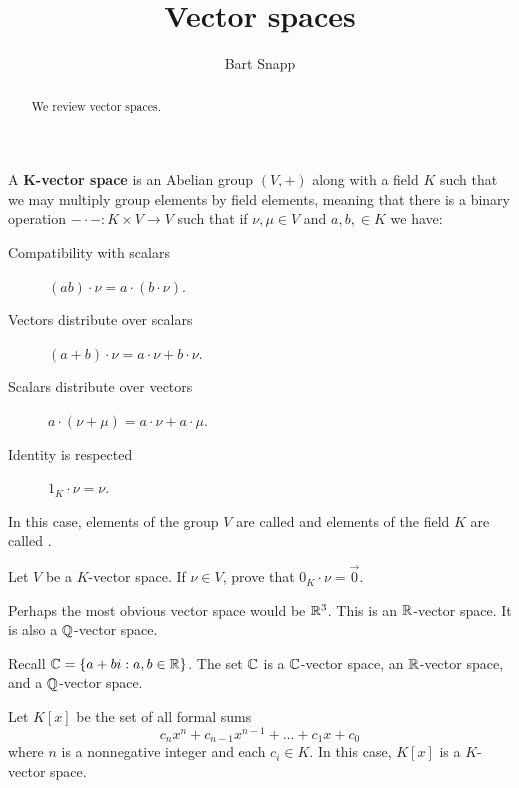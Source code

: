 \documentclass{ximera}
\author{Bart Snapp}
\title{Vector spaces}
\begin{document}
\begin{abstract}
  We review vector spaces.
\end{abstract}
\maketitle



\begin{definition}
  A \textbf{$\boldsymbol{K}$-vector space} is an Abelian group $(V,+)$
  along with a field $K$ such that we may multiply group elements by
  field elements, meaning that there is a binary operation $-\cdot-:
  K\times V \to V$ such that if $\nu,\mu\in V$ and $a,b,\in K$ we
  have:
\begin{description}
\item[Compatibility with scalars] $(ab)\cdot \nu = a\cdot (b\cdot \nu)$.
\item[Vectors distribute over scalars] $(a+b)\cdot \nu =
  a\cdot\nu + b\cdot \nu$.
\item[Scalars distribute over vectors] $a\cdot (\nu+\mu) =
  a\cdot \nu + a\cdot \mu$.
\item[Identity is respected] $1_K\cdot \nu = \nu$.
\end{description}
In this case, elements of the group $V$ are called  and
elements of the field $K$ are called .
\end{definition}


\begin{exercise}
  Let $V$ be a $K$-vector space. If $\nu\in V$, prove that
  $0_K\cdot \nu = \vec{0}$.
\end{exercise}


\begin{example}
  Perhaps the most obvious vector space would be $\mathbb R^3$. This is an
  $\mathbb R$-vector space. It is also a $\mathbb Q$-vector space.
\end{example}



\begin{example}
  Recall $\mathbb C = \{a+bi:a,b\in\mathbb R\}$. The set $\mathbb C$ is a $\mathbb C$-vector
  space, an $\mathbb R$-vector space, and a $\mathbb Q$-vector space.
\end{example}


\begin{example}[Polynomials]
  Let $K[x]$ be the set of all formal sums
  \[
  c_nx^n + c_{n-1}x^{n-1} + \dots + c_1 x + c_0
  \]
  where $n$ is a nonnegative integer and each $c_i \in K$. In this
  case, $K[x]$ is a $K$-vector space.
\end{example}
\end{document}
